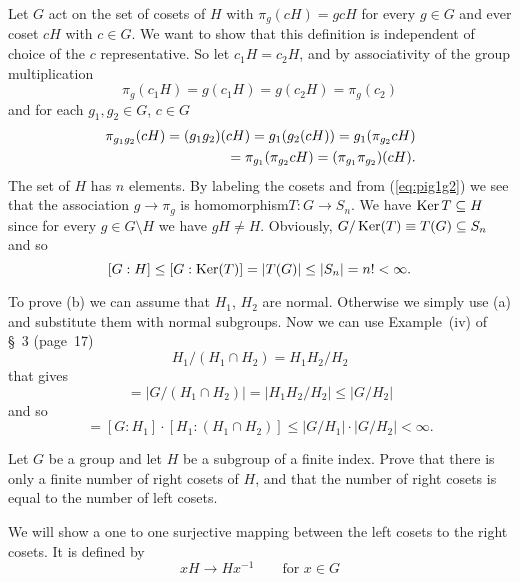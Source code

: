 \documentclass[12pt]{book}
\def\Ker{\mathop{\rm Ker}\nolimits}
\newcounter{myenumi}
\newenvironment{myenumerate}
{\begin{enumerate}
 \setcounter{enumi}{\themyenumi}
}
{\setcounter{myenumi}{\theenumi}
 \end{enumerate}}
\begin{document}
\begin{myenumerate}
Let $G$ act on the set of cosets of $H$ with \(\pi_g(cH) = gcH\)
for every \(g\in G\) and ever coset \(cH\) with \(c\in G\).
We want to show that this definition is independent of choice of
the $c$ representative.
So let \(c_1H = c_2H\), %
and by associativity of the group multiplication
\[\pi_g(c_1H) = g(c_1H) = g(c_2H) = \pi_g(c_2)\]
and for each \(g_1,g_2\in G\), \(c\in G\)
\begin{eqnarray} \label{eq:pig1g2}
\pi_{g_1g_2}(cH) = (g_1g_2)(cH) = g_1(g_2(cH)) =  g_1(\pi_{g_2}cH) \\
  \hfill = \pi_{g_1}(\pi_{g_2}cH) = (\pi_{g_1}\pi_{g_2})(cH). \nonumber
\end{eqnarray}
The set of $H$ has $n$ elements.
By labeling the cosets
and from (\ref{eq:pig1g2})
we see that the association \(g\rightarrow \pi_g\)
is homomorphism\(T:G\rightarrow S_n\).
We have \(\Ker T \subseteq H\) since
for every \(g\in G\setminus H\) we have \(gH\neq H\).
Obviously, \(G/\Ker(T) \equiv T(G) \subseteq S_n\) and so
\[[G:H] \leq [G:\Ker(T)] = |T(G)| \leq |S_n| = n! < \infty.\]

To prove (b) we can assume that \(H_1\), \(H_2\) are normal.
Otherwise we simply use (a) and substitute them with normal subgroups.
Now we can use Example~(iv) of \S~3 (page~17)
\begin{equation}
H_1/(H_1\cap H_2) = H_1 H_2 / H_2
\end{equation}
that gives
\begin{equation}
[H_1:(H_1\cap H_2)] =
|G/(H_1\cap H_2)| =
|H_1 H_2 / H_2| \leq
|G/H_2|
\end{equation}
and so
\begin{equation}
[G:(H_1\cap H_2)] =
[G:H_1]\cdot[H_1:(H_1\cap H_2)] \leq
|G/H_1|\cdot|G/H_2| < \infty.
\end{equation}



\begin{excopy}
Let $G$ be a group and let $H$ be a subgroup of a finite index.
Prove that there is only a finite number of right cosets of $H$, and that
the number of right cosets is equal to the number of left cosets.
\end{excopy}

We will show a one to one surjective mapping between
the left cosets to the right cosets. It is defined by
\begin{equation} \label{eq:xH2Hx}
xH \rightarrow Hx^{-1} \qquad\textrm{for\ } x\in G
\end{equation}


\end{myenumerate}
\end{document}
